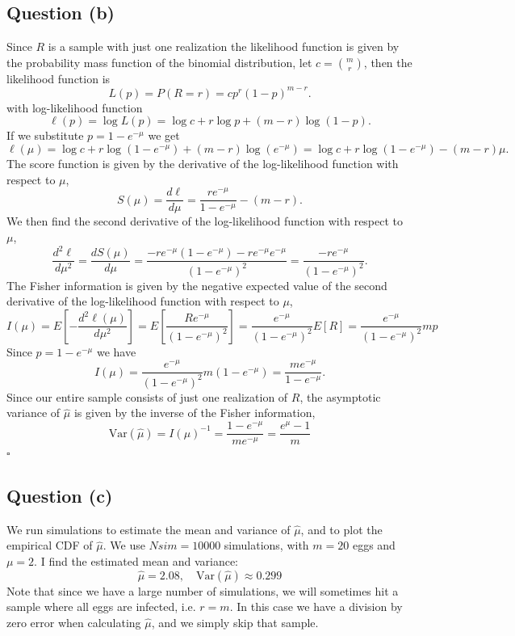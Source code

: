 \documentclass{article}
\theoremstyle{definition}
\theoremstyle{remark}
\begin{document}
\subsection*{Question (b)}
Since $R$ is a sample with just one realization the likelihood function is given by the probability mass function of the binomial distribution, let $c = \binom{m}{r}$, then the likelihood function is
\[
    L(p) = P(R=r) =c p^r(1-p)^{m-r}.
\]
with log-likelihood function
\[
    \ell(p) = \log L(p) = \log c + r\log p + (m-r)\log(1-p).
\]
If we substitute $p = 1 - e^{-\mu}$ we get
\[
    \ell(\mu) = \log c + r\log(1 - e^{-\mu}) + (m-r)\log(e^{-\mu}) = \log c + r\log(1 - e^{-\mu}) - (m-r)\mu.
\]
The score function is given by the derivative of the log-likelihood function with respect to $\mu$,
\[
    S(\mu) = \frac{d\ell}{d\mu} = \frac{re^{-\mu}}{1 - e^{-\mu}} - (m-r).
\]
We then find the second derivative of the log-likelihood function with respect to $\mu$,
\[
    \frac{d^2\ell}{d\mu^2} = \frac{dS(\mu)}{d\mu} = \frac{-re^{-\mu}(1 - e^{-\mu}) -re^{-\mu} e^{-\mu} }{(1 - e^{-\mu})^2} = \frac{-re^{-\mu}}{(1 - e^{-\mu})^2}.
\]
The Fisher information is given by the negative expected value of the second derivative of the log-likelihood function with respect to $\mu$,
\[
    I(\mu) = E\left[-\frac{d^2\ell(\mu)}{d\mu^2}\right] = E[\frac{Re^{-\mu}}{(1 - e^{-\mu})^2}] = \frac{e^{-\mu}}{(1 - e^{-\mu})^2}E[R] = \frac{e^{-\mu}}{(1 - e^{-\mu})^2}mp
\]
Since $p = 1 - e^{-\mu}$ we have
\[
    I(\mu) = \frac{e^{-\mu}}{(1 - e^{-\mu})^2}m(1 - e^{-\mu}) = \frac{me^{-\mu}}{1 - e^{-\mu}}.
\]
Since our entire sample consists of just one realization of $R$, the asymptotic variance of $\hat{\mu}$ is given by the inverse of the Fisher information,
\[
    \text{Var}(\hat{\mu}) = I(\mu)^{-1} = \frac{1 - e^{-\mu}}{me^{-\mu}}   = \frac{e^{\mu} - 1}{m} 
\]
$\square$


\subsection*{Question (c)}

We run simulations to estimate the mean and variance of $\hat{\mu}$, and to plot the empirical CDF of $\hat{\mu}$. We use $Nsim = 10000$ simulations, with $m = 20$ eggs and $\mu = 2$. I find the estimated mean and variance:
\begin{equation}
    \hat{\mu} = 2.08, \quad \text{Var}(\hat{\mu}) \approx 0.299
\end{equation}
Note that since we have a large number of simulations, we will sometimes hit a sample where all eggs are infected, i.e. $r = m$. In this case we have a division by zero error when calculating $\hat{\mu}$, and we simply skip that sample.
\end{document}

